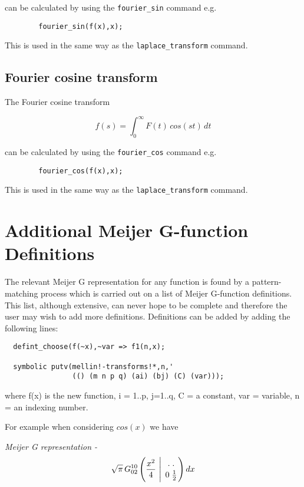 can be calculated by using the \verb+fourier_sin+ command e.g.
\begin{verbatim}
        fourier_sin(f(x),x);
\end{verbatim}

This is used in the same way as the \verb+laplace_transform+ command.

\subsection{Fourier cosine transform}

The Fourier cosine transform

\begin{displaymath}
f(s) = \int_{0}^{\infty} F(t) \,cos (st) \,dt
\end{displaymath}

can be calculated by using the \verb+fourier_cos+ command e.g.
\begin{verbatim}
        fourier_cos(f(x),x);
\end{verbatim}

This is used in the same way as the \verb+laplace_transform+ command.

\section{Additional Meijer G-function Definitions}

The relevant Meijer G representation for any function is found by a
pattern-matching process which is carried out on a list of Meijer
G-function definitions. This list, although extensive, can never hope
to be complete and therefore the user may wish to add more definitions.
Definitions can be added by adding the following lines:

\begin{verbatim}
  defint_choose(f(~x),~var => f1(n,x);

  symbolic putv(mellin!-transforms!*,n,'
                (() (m n p q) (ai) (bj) (C) (var)));

\end{verbatim}
     where f(x) is the new function, i = 1..p, j=1..q, C = a constant,
     var = variable, n = an indexing number.

For example when considering $cos (x)$ we have

\it Meijer G representation  -
\begin{displaymath}
\sqrt{\pi} \,G^{1 0}_{0 2}\left(\frac{x^{2}}{4} \ \Bigg\vert
\ { . \; . \atop 0 \; \frac{1}{2}} \right) dx
\end{displaymath}

